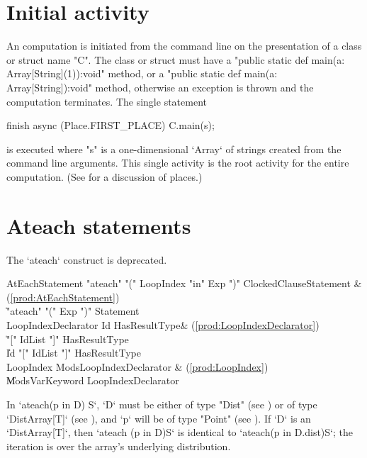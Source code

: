 \section{Initial activity}\label{initial-computation}

An \Xten{} computation is initiated from the command line on the
presentation of a class or struct name \xcd"C". The class or struct must have a
\xcd"public static def main(a: Array[String](1)):void" method, 
or a \xcd"public static def main(a: Array[String]):void" method, 
otherwise an exception is thrown
and the computation terminates.  The single statement
\begin{xten}
finish async (Place.FIRST_PLACE) {
  C.main(s);
}
\end{xten} 
\noindent is executed where \xcd"s" is a one-dimensional \xcd`Array` of
strings created 
from the command line arguments. This single activity is the root activity
for the entire computation. (See  for a discussion of
places.)


\section{Ateach statements}\label{ateach-section}
\deprecated{} The \xcd`ateach` construct is deprecated.

\begin{bbgrammar}
 AtEachStatement    \: \xcd"ateach" \xcd"(" LoopIndex \xcd"in" Exp \xcd")" ClockedClause\opt Statement & (\ref{prod:AtEachStatement})\\%
    \| \xcd"ateach" \xcd"(" Exp \xcd")" Statement\\
 LoopIndexDeclarator    \: Id HasResultType\opt & (\ref{prod:LoopIndexDeclarator})\\%
    \| \xcd"[" IdList \xcd"]" HasResultType\opt\\
    \| Id \xcd"[" IdList \xcd"]" HasResultType\opt\\
 LoopIndex    \: Mods\opt LoopIndexDeclarator & (\ref{prod:LoopIndex})\\%
    \| Mods\opt VarKeyword LoopIndexDeclarator\\
\end{bbgrammar}
In \xcd`ateach(p in D) S`, \xcd`D` must be either of type \xcd"Dist"
(see ) or of type \xcd`DistArray[T]` (see
), and \xcd`p` will be of type \xcd"Point" (see
). If \xcd`D` is an \xcd`DistArray[T]`, then
\xcd`ateach (p in D)S` is identical to 
\xcd`ateach(p in D.dist)S`; the iteration is over the array's underlying
distribution.   

